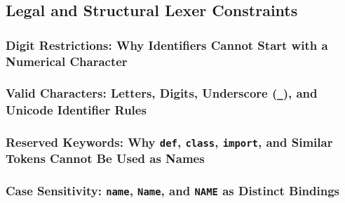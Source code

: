 \subsection{Legal and Structural Lexer Constraints}
\subsubsection{Digit Restrictions: Why Identifiers Cannot Start with a Numerical Character}
\subsubsection{Valid Characters: Letters, Digits, Underscore (\texttt{\_}), and Unicode Identifier Rules}
\subsubsection{Reserved Keywords: Why \texttt{def}, \texttt{class}, \texttt{import}, and Similar Tokens Cannot Be Used as Names}
\subsubsection{Case Sensitivity: \texttt{name}, \texttt{Name}, and \texttt{NAME} as Distinct Bindings}
